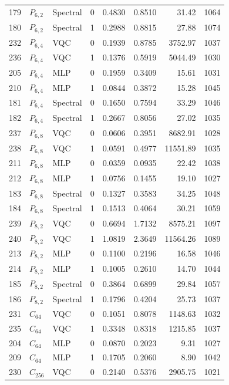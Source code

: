 \documentclass[11pt]{article}
\begin{document}
\begin{longtable}{rllrrrrr}
179 & $P_{6,2}$ & Spectral & 0 & 0.4830 & 0.8510 & 31.42 & 1064 \\
180 & $P_{6,2}$ & Spectral & 1 & 0.2988 & 0.8815 & 27.88 & 1074 \\
232 & $P_{6,4}$ & VQC & 0 & 0.1939 & 0.8785 & 3752.97 & 1037 \\
236 & $P_{6,4}$ & VQC & 1 & 0.1376 & 0.5919 & 5044.49 & 1030 \\
205 & $P_{6,4}$ & MLP & 0 & 0.1959 & 0.3409 & 15.61 & 1031 \\
210 & $P_{6,4}$ & MLP & 1 & 0.0844 & 0.3872 & 15.28 & 1045 \\
181 & $P_{6,4}$ & Spectral & 0 & 0.1650 & 0.7594 & 33.29 & 1046 \\
182 & $P_{6,4}$ & Spectral & 1 & 0.2667 & 0.8056 & 27.02 & 1035 \\
237 & $P_{6,8}$ & VQC & 0 & 0.0606 & 0.3951 & 8682.91 & 1028 \\
238 & $P_{6,8}$ & VQC & 1 & 0.0591 & 0.4977 & 11551.89 & 1035 \\
211 & $P_{6,8}$ & MLP & 0 & 0.0359 & 0.0935 & 22.42 & 1038 \\
212 & $P_{6,8}$ & MLP & 1 & 0.0756 & 0.1455 & 19.10 & 1027 \\
183 & $P_{6,8}$ & Spectral & 0 & 0.1327 & 0.3583 & 34.25 & 1048 \\
184 & $P_{6,8}$ & Spectral & 1 & 0.1513 & 0.4064 & 30.21 & 1059 \\
239 & $P_{8,2}$ & VQC & 0 & 0.6694 & 1.7132 & 8575.21 & 1097 \\
240 & $P_{8,2}$ & VQC & 1 & 1.0819 & 2.3649 & 11564.26 & 1089 \\
213 & $P_{8,2}$ & MLP & 0 & 0.1100 & 0.2196 & 16.58 & 1046 \\
214 & $P_{8,2}$ & MLP & 1 & 0.1005 & 0.2610 & 14.70 & 1044 \\
185 & $P_{8,2}$ & Spectral & 0 & 0.3864 & 0.6899 & 29.84 & 1057 \\
186 & $P_{8,2}$ & Spectral & 1 & 0.1796 & 0.4204 & 25.73 & 1037 \\
231 & $C_{64}$ & VQC & 0 & 0.1051 & 0.8078 & 1148.63 & 1032 \\
235 & $C_{64}$ & VQC & 1 & 0.3348 & 0.8318 & 1215.85 & 1037 \\
204 & $C_{64}$ & MLP & 0 & 0.0870 & 0.2023 & 9.31 & 1027 \\
209 & $C_{64}$ & MLP & 1 & 0.1705 & 0.2060 & 8.90 & 1042 \\
230 & $C_{256}$ & VQC & 0 & 0.2140 & 0.5376 & 2905.75 & 1021 \\

\end{longtable}
\end{document}
